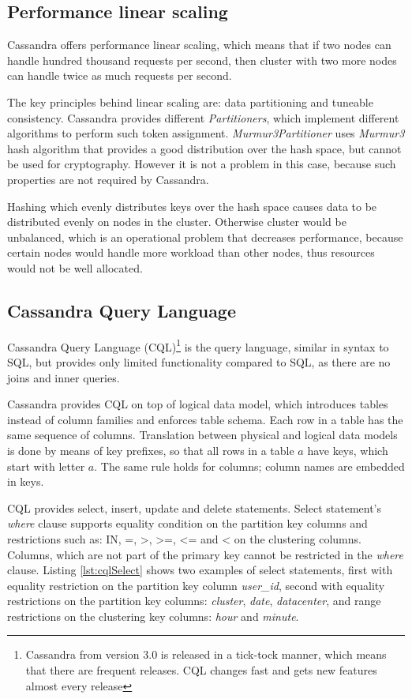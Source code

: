 \subsection{Performance linear scaling}
\label{sec:theory:cassandra:linear}
Cassandra offers performance linear scaling, which means that if two nodes can handle hundred thousand requests per second, then cluster with two more nodes can handle twice as much requests per second. 

The key principles behind linear scaling are: data partitioning and tuneable consistency. 
Cassandra provides different \emph{Partitioners}, which implement different algorithms to perform such token assignment. \emph{Murmur3Partitioner} uses \emph{Murmur3} \cite{Murmur3} hash algorithm that provides a good distribution over the hash space, but cannot be used for cryptography.  However it is not a problem in this case, because such properties are not required by Cassandra.

Hashing which evenly distributes keys over the hash space causes data to be distributed evenly on nodes in the cluster. Otherwise cluster would be unbalanced, which is an operational problem that decreases performance, because certain nodes would handle more workload than other nodes, thus resources would not be well allocated.




\subsection{Cassandra Query Language}
\label{sec:theory:cassandra:cql}
Cassandra Query Language (CQL)\footnote{Cassandra from version 3.0 is released in a tick-tock manner, which means that there are frequent releases. CQL changes fast and gets new features almost every release} is the query language, similar in syntax to SQL, but provides only limited functionality compared to SQL, as there are no joins and inner queries. 

Cassandra provides CQL on top of logical data model, which introduces tables instead of column families and enforces table schema. Each row in a table has the same sequence of columns. Translation between physical and logical data models is done by means of key prefixes, so that all rows in a table $a$ have keys, which start with letter $a$. The same rule holds for columns; column names are embedded in keys.

CQL provides select, insert, update and delete statements. Select statement's \emph{where} clause supports equality condition on the partition key columns and restrictions such as: IN, =, >, >=, <= and < on the clustering columns. Columns, which are not part of the primary key cannot be restricted in the \emph{where} clause. Listing \ref{lst:cqlSelect} shows two examples of select statements, first with equality restriction on the partition key column \emph{user_id}, second with equality restrictions on the partition key columns: \emph{cluster}, \emph{date}, \emph{datacenter}, and range restrictions on the clustering key columns: \emph{hour} and \emph{minute}.


